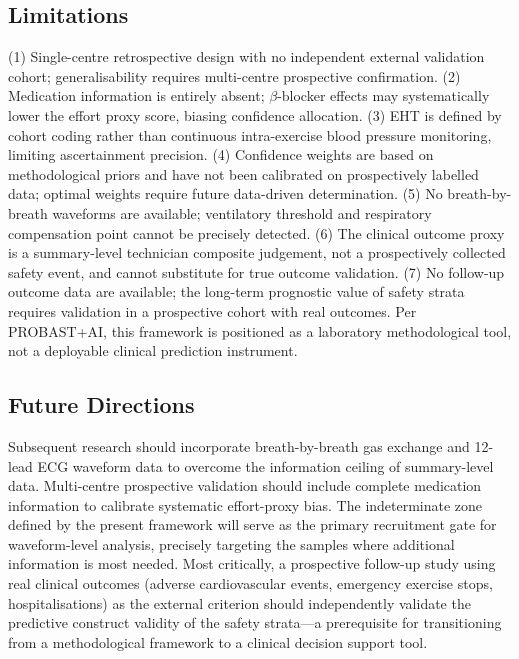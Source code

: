 \documentclass[12pt, a4paper]{article}
\begin{document}
\subsection{Limitations}

(1) Single-centre retrospective design with no independent external validation
cohort; generalisability requires multi-centre prospective confirmation.
(2) Medication information is entirely absent; $\beta$-blocker effects may
systematically lower the effort proxy score, biasing confidence allocation.
(3) EHT is defined by cohort coding rather than continuous intra-exercise blood
pressure monitoring, limiting ascertainment precision.
(4) Confidence weights are based on methodological priors and have not been
calibrated on prospectively labelled data; optimal weights require future
data-driven determination.
(5) No breath-by-breath waveforms are available; ventilatory threshold and
respiratory compensation point cannot be precisely detected.
(6) The clinical outcome proxy is a summary-level technician composite
judgement, not a prospectively collected safety event, and cannot substitute
for true outcome validation.
(7) No follow-up outcome data are available; the long-term prognostic value
of safety strata requires validation in a prospective cohort with real outcomes.
Per PROBAST+AI\cite{PROBASTAI2025}, this framework is positioned as a
laboratory methodological tool, not a deployable clinical prediction instrument.

\subsection{Future Directions}

Subsequent research should incorporate breath-by-breath gas exchange and 12-lead
ECG waveform data\cite{Hearn2018,Zignoli2022ejss} to overcome the information
ceiling of summary-level data. Multi-centre prospective validation should include
complete medication information to calibrate systematic effort-proxy bias.
The indeterminate zone defined by the present framework will serve as the primary
recruitment gate for waveform-level analysis, precisely targeting the samples
where additional information is most needed.
Most critically, a prospective follow-up study using real clinical outcomes
(adverse cardiovascular events, emergency exercise stops, hospitalisations) as
the external criterion should independently validate the predictive construct
validity of the safety strata\cite{MECKI2023}---a prerequisite for transitioning
from a methodological framework to a clinical decision support tool.
\end{document}

